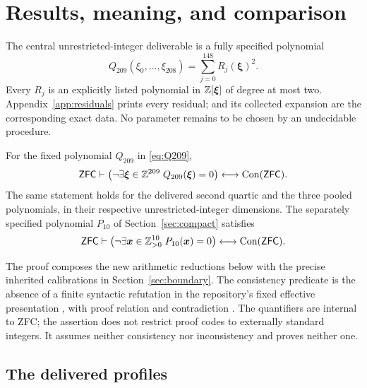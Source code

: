 \section{Results, meaning, and comparison}
\label{sec:overview}

The central unrestricted-integer deliverable is a fully specified polynomial
\begin{equation}\label{eq:Q209}
 Q_{209}(\xi_0,\ldots,\xi_{208})
   =\sum_{j=0}^{148}R_j(\boldsymbol\xi)^2.
\end{equation}
Every \(R_j\) is an explicitly listed polynomial in \(\mathbb Z[\boldsymbol\xi]\)
of degree at most two. Appendix~\ref{app:residuals} prints every residual;
 and its collected
expansion are the corresponding exact data. No parameter remains to be
chosen by an undecidable procedure.

\begin{theorem}\label{thm:main}
For the fixed polynomial \(Q_{209}\) in \eqref{eq:Q209},
\[
 \mathsf{ZFC}\vdash
 \left(\neg\exists\boldsymbol\xi\in\mathbb Z^{209}\;
                    Q_{209}(\boldsymbol\xi)=0\right)
       \longleftrightarrow\operatorname{Con}(\mathsf{ZFC}).
\]
The same statement holds for the delivered second quartic and the three
pooled polynomials, in their respective unrestricted-integer dimensions.
The separately specified polynomial \(P_{10}\) of
Section~\ref{sec:compact} satisfies
\[
 \mathsf{ZFC}\vdash
 \left(\neg\exists\boldsymbol x\in\mathbb Z_{>0}^{10}\;
                    P_{10}(\boldsymbol x)=0\right)
       \longleftrightarrow\operatorname{Con}(\mathsf{ZFC}).
\]
\end{theorem}

The proof composes the new arithmetic reductions below with the precise
inherited calibrations in Section~\ref{sec:boundary}. The consistency
predicate is the absence of a finite syntactic refutation in the
repository's fixed effective presentation , with proof
relation  and contradiction . The quantifiers
are internal to ZFC; the assertion does not restrict proof codes to
externally standard integers. It assumes neither consistency nor
inconsistency and proves neither one.

\subsection{The delivered profiles}


